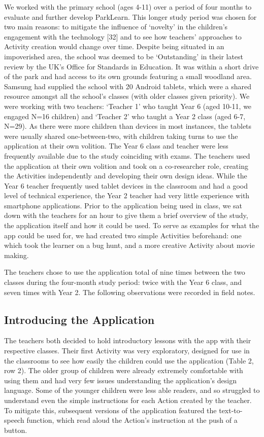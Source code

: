 We worked with the primary school (ages 4-11) over a period of four months to
evaluate and further develop ParkLearn. This longer study period was chosen for
two main reasons: to mitigate the influence of ‘novelty’ in the children’s
engagement with the technology [32] and to see how teachers’ approaches to
Activity creation would change over time. Despite being situated in an
impoverished area, the school was deemed to be ‘Outstanding’ in their latest
review by the UK’s Office for Standards in Education. It was within a short
drive of the park and had access to its own grounds featuring a small woodland
area. Samsung had supplied the school with 20 Android tablets, which were a
shared resource amongst all the school’s classes (with older classes given
priority). We were working with two teachers: ‘Teacher 1’ who taught Year 6
(aged 10-11, we engaged N=16 children) and ‘Teacher 2’ who taught a Year 2 class
(aged 6-7, N=29). As there were more children than devices in most instances,
the tablets were usually shared one-between-two, with children taking turns to
use the application at their own volition. The Year 6 class and teacher were
less frequently available due to the study coinciding with exams. The teachers
used the application at their own volition and took on a co-researcher role,
creating the Activities independently and developing their own design ideas.
While the Year 6 teacher frequently used tablet devices in the classroom and had
a good level of technical experience, the Year 2 teacher had very little
experience with smartphone applications. Prior to the application being used in
class, we sat down with the teachers for an hour to give them a brief overview
of the study, the application itself and how it could be used. To serve as
examples for what the app could be used for, we had created two simple
Activities beforehand: one which took the learner on a bug hunt, and a more
creative Activity about movie making.

The teachers chose to use the application total of nine times between the two classes during the four-month study period: twice with the Year 6 class, and seven times with Year 2. The following observations were recorded in field notes.

\subsection{Introducing the Application}

The teachers both decided to hold introductory lessons with the app with their
respective classes. Their first Activity was very exploratory, designed for use
in the classrooms to see how easily the children could use the application
(Table 2, row 2). The older group of children were already extremely comfortable
with using them and had very few issues understanding the application’s design
language. Some of the younger children were less able readers, and so struggled
to understand even the simple instructions for each Action created by the
teacher. To mitigate this, subsequent versions of the application featured the
text-to-speech function, which read aloud the Action’s instruction at the push
of a button.


